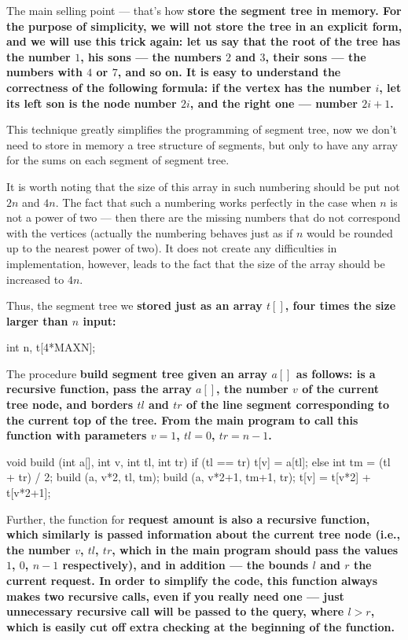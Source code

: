 The main selling point --- that's how \bf{store} the segment tree in memory. For the purpose of simplicity, we will not store the tree in an explicit form, and we will use this trick again: let us say that the root of the tree has the number $1$, his sons --- the numbers $2$ and $3$, their sons --- the numbers with $4$ or $7$, and so on. It is easy to understand the correctness of the following formula: if the vertex has the number $i$, let its left son is the node number $2i$, and the right one --- number $2i+1$.

This technique greatly simplifies the programming of segment tree, now we don't need to store in memory a tree structure of segments, but only to have any array for the sums on each segment of segment tree.

It is worth noting that the size of this array in such numbering should be put not $2n$ and $4n$. The fact that such a numbering works perfectly in the case when $n$ is not a power of two --- then there are the missing numbers that do not correspond with the vertices (actually the numbering behaves just as if $n$ would be rounded up to the nearest power of two). It does not create any difficulties in implementation, however, leads to the fact that the size of the array should be increased to $4n$.

Thus, the segment tree we \bf{stored} just as an array $t[]$, four times the size larger than $n$ input:

\code
int n, t[4*MAXN];
\endcode

The procedure \bf{build segment tree} given an array $a[]$ as follows: is a recursive function, pass the array $a[]$, the number $v$ of the current tree node, and borders $tl$ and $tr$ of the line segment corresponding to the current top of the tree. From the main program to call this function with parameters $v=1$, $tl=0$, $tr=n-1$.

\code
void build (int a[], int v, int tl, int tr) {
if (tl == tr)
t[v] = a[tl];
else {
int tm = (tl + tr) / 2;
build (a, v*2, tl, tm);
build (a, v*2+1, tm+1, tr);
t[v] = t[v*2] + t[v*2+1];
}
}
\endcode

Further, the function for \bf{request amount} is also a recursive function, which similarly is passed information about the current tree node (i.e., the number $v$, $tl$, $tr$, which in the main program should pass the values $1$, $0$, $n-1$ respectively), and in addition --- the bounds $l$ and $r$ the current request. In order to simplify the code, this function always makes two recursive calls, even if you really need one --- just unnecessary recursive call will be passed to the query, where $l > r$, which is easily cut off extra checking at the beginning of the function.

